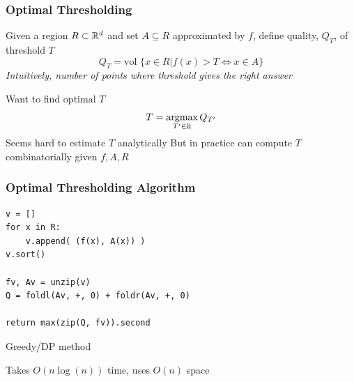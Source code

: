 \documentclass{beamer}
\begin{document}
\begin{frame}
\frametitle{Optimal Thresholding}
Given a region $R \subset \mathbb{R}^d$ and set $A \subseteq R$ approximated by $f$, define quality, $Q_T$, of threshold $T$
\[ Q_T = \text{vol } \{ x \in R | f(x) > T \Leftrightarrow x \in A \} \]
\emph{Intuitively, number of points where threshold gives the right answer}

Want to find optimal $T$
\[ T = \mathop{\text{argmax}}_{T' \in \mathbb{R}} Q_{T'} \]
Seems hard to estimate $T$ analytically
\pause
\vskip5pt
But in practice can compute $T$ combinatorially given $f, A, R$
\end{frame}

\begin{frame}[fragile]
\frametitle{Optimal Thresholding Algorithm}
\begin{lstlisting}
v = []
for x in R:
    v.append( (f(x), A(x)) )
v.sort()

fv, Av = unzip(v)
Q = foldl(Av, +, 0) + foldr(Av, +, 0)

return max(zip(Q, fv)).second
\end{lstlisting}

\vskip10pt
Greedy/DP method

\vskip10pt
Takes $O(n \log(n))$ time, uses $O(n)$ space
\end{frame}
\end{document}
